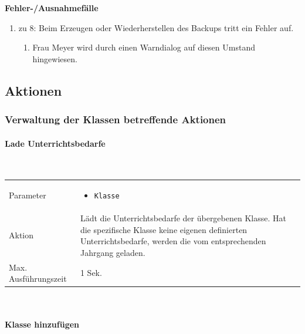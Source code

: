 \documentclass[fontsize=12pt,paper=a4,twoside]{scrartcl}
\begin{document}
\textbf{Fehler-/Ausnahmefälle}
\begin{enumerate}
\item zu 8: Beim Erzeugen oder Wiederherstellen des Backups tritt ein Fehler auf.
	\begin{enumerate}[label=\arabic*.]
	\item Frau Meyer wird durch einen Warndialog auf diesen Umstand hingewiesen.
	\end{enumerate}
\end{enumerate}


\subsection{Aktionen}

\subsubsection{Verwaltung der Klassen betreffende Aktionen}

\paragraph{Lade Unterrichtsbedarfe}\mbox{}\\

\begin{tabularx}{\textwidth}{p{4cm}X}
Parameter & \begin{itemize}[itemsep=0pt, leftmargin = 0.5cm]
			\item \texttt{Klasse}
			\end{itemize}\\
Aktion & Lädt die Unterrichtsbedarfe der übergebenen Klasse. Hat die spezifische Klasse keine eigenen definierten Unterrichtsbedarfe, werden die vom entsprechenden Jahrgang geladen.\\
Max. Ausführungszeit & 1 Sek. 
\end{tabularx}\\


\paragraph{Klasse hinzufügen}\mbox{}\\
\end{document}
